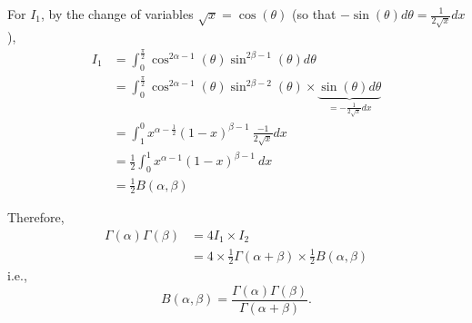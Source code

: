\begin{frame}
For $I_1$, by the change of variables $\sqrt{x}=\cos(\theta)$ (so that $-\sin(\theta)d\theta = \frac{1}{2\sqrt{x}}dx$),
\vfill
\begin{align*}
I_1 &=
\int_0^{\frac{\pi}{2}}
 \cos^{2\alpha-1}(\theta)\sin^{2\beta-1}(\theta)d\theta
\\ & =  \int_0^{\frac{\pi}{2}}
 \cos^{2\alpha-1}(\theta)\sin^{2\beta-2}(\theta) \times \underbrace{\sin(\theta)d\theta}_{=-\frac{1}{2\sqrt{x}}dx} \\
&= \int_1^0  x^{\alpha-\frac{1}{2}}(1-x)^{\beta-1} \: \frac{-1}{2\sqrt{x}}dx\\
&= \frac{1}{2}\int_0^1  x^{\alpha-1}(1-x)^{\beta-1} \: dx
\\& = \frac12 B(\alpha,\beta)
\end{align*}
\end{frame}
\begin{frame}
Therefore,
\begin{align*}
	\Gamma(\alpha) \Gamma(\beta) & = 4 I_1 \times I_2 \\
				     &= 4 \times \frac12 \Gamma(\alpha+\beta) \times \frac12 B(\alpha,\beta)
\end{align*}
i.e.,
\[
	B(\alpha,\beta) = \frac{\Gamma(\alpha)\Gamma(\beta)}{\Gamma(\alpha+\beta)}.
\]
\myEnd
\end{frame}
